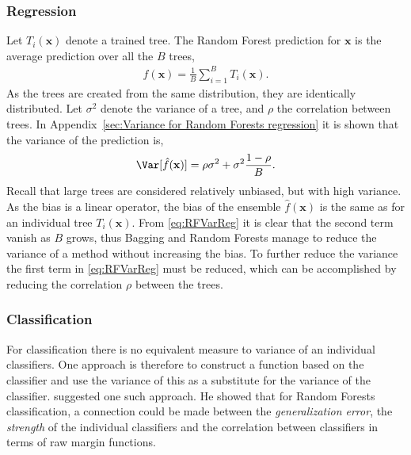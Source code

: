 \subsubsection{Regression}
\label{sub:Regression}

Let $T_i(\mathbf{x})$ denote a trained tree. The Random Forest prediction for $\mathbf{x}$ is the average prediction over all the $B$ trees,
\begin{align}
  \hat f(\mathbf{x}) = \frac{1}{B} \sum_{i = 1}^{B} T_i(\mathbf{x}).
\end{align}
As the trees are created from the same distribution, they are identically distributed. Let $\sigma^2$ denote the variance of a tree, and $\rho$ the correlation between trees. In Appendix~\ref{sec:Variance for Random Forests regression} it is shown that the variance of the prediction is, 
\begin{align}
\label{eq:RFVarReg} 
  \Var[\hat f(\mathbf{x})] = \rho \sigma^2 + \sigma^2 \frac{1-\rho}{B}.
\end{align}
Recall that large trees are considered relatively unbiased, but with high variance. As the bias is a linear operator, the bias of the ensemble $\hat f(\mathbf{x})$ is the same as for an individual tree $T_i(\mathbf{x})$. From \eqref{eq:RFVarReg} it is clear that the second term vanish as $B$ grows, thus Bagging and Random Forests manage to reduce the variance of a method without increasing the bias. To further reduce the variance the first term in \eqref{eq:RFVarReg} must be reduced, which can be accomplished by reducing the correlation $\rho$ between the trees. 

\subsubsection{Classification}
\label{sub:Classification}
For classification there is no equivalent measure to variance of an individual classifiers. One approach is therefore to construct a function based on the classifier and use the variance of this as a substitute for the variance of the classifier. 
\cite{randomforests} suggested one such approach. He showed that for Random Forests classification, a connection could be made between the \textit{generalization error}, the \textit{strength} of the individual classifiers and the correlation between classifiers in terms of raw margin functions. 

